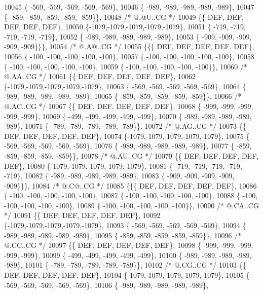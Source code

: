 \begin{DoxyCode}
10045 \{ -569, -569, -569, -569, -569\},
10046 \{ -989, -989, -989, -989, -989\},
10047 \{ -859, -859, -859, -859, -859\}\},
10048 \textcolor{comment}{/*  @.@U..CG */}
10049 \{\{  DEF,  DEF,  DEF,  DEF,  DEF\},
10050 \{-1079,-1079,-1079,-1079,-1079\},
10051 \{ -719, -719, -719, -719, -719\},
10052 \{ -989, -989, -989, -989, -989\},
10053 \{ -909, -909, -909, -909, -909\}\}\},
10054 \textcolor{comment}{/*  @.A@..CG */}
10055 \{\{\{  DEF,  DEF,  DEF,  DEF,  DEF\},
10056 \{ -100, -100, -100, -100, -100\},
10057 \{ -100, -100, -100, -100, -100\},
10058 \{ -100, -100, -100, -100, -100\},
10059 \{ -100, -100, -100, -100, -100\}\},
10060 \textcolor{comment}{/*  @.AA..CG */}
10061 \{\{  DEF,  DEF,  DEF,  DEF,  DEF\},
10062 \{-1079,-1079,-1079,-1079,-1079\},
10063 \{ -569, -569, -569, -569, -569\},
10064 \{ -989, -989, -989, -989, -989\},
10065 \{ -859, -859, -859, -859, -859\}\},
10066 \textcolor{comment}{/*  @.AC..CG */}
10067 \{\{  DEF,  DEF,  DEF,  DEF,  DEF\},
10068 \{ -999, -999, -999, -999, -999\},
10069 \{ -499, -499, -499, -499, -499\},
10070 \{ -989, -989, -989, -989, -989\},
10071 \{ -789, -789, -789, -789, -789\}\},
10072 \textcolor{comment}{/*  @.AG..CG */}
10073 \{\{  DEF,  DEF,  DEF,  DEF,  DEF\},
10074 \{-1079,-1079,-1079,-1079,-1079\},
10075 \{ -569, -569, -569, -569, -569\},
10076 \{ -989, -989, -989, -989, -989\},
10077 \{ -859, -859, -859, -859, -859\}\},
10078 \textcolor{comment}{/*  @.AU..CG */}
10079 \{\{  DEF,  DEF,  DEF,  DEF,  DEF\},
10080 \{-1079,-1079,-1079,-1079,-1079\},
10081 \{ -719, -719, -719, -719, -719\},
10082 \{ -989, -989, -989, -989, -989\},
10083 \{ -909, -909, -909, -909, -909\}\}\},
10084 \textcolor{comment}{/*  @.C@..CG */}
10085 \{\{\{  DEF,  DEF,  DEF,  DEF,  DEF\},
10086 \{ -100, -100, -100, -100, -100\},
10087 \{ -100, -100, -100, -100, -100\},
10088 \{ -100, -100, -100, -100, -100\},
10089 \{ -100, -100, -100, -100, -100\}\},
10090 \textcolor{comment}{/*  @.CA..CG */}
10091 \{\{  DEF,  DEF,  DEF,  DEF,  DEF\},
10092 \{-1079,-1079,-1079,-1079,-1079\},
10093 \{ -569, -569, -569, -569, -569\},
10094 \{ -989, -989, -989, -989, -989\},
10095 \{ -859, -859, -859, -859, -859\}\},
10096 \textcolor{comment}{/*  @.CC..CG */}
10097 \{\{  DEF,  DEF,  DEF,  DEF,  DEF\},
10098 \{ -999, -999, -999, -999, -999\},
10099 \{ -499, -499, -499, -499, -499\},
10100 \{ -989, -989, -989, -989, -989\},
10101 \{ -789, -789, -789, -789, -789\}\},
10102 \textcolor{comment}{/*  @.CG..CG */}
10103 \{\{  DEF,  DEF,  DEF,  DEF,  DEF\},
10104 \{-1079,-1079,-1079,-1079,-1079\},
10105 \{ -569, -569, -569, -569, -569\},
10106 \{ -989, -989, -989, -989, -989\},

\end{DoxyCode}

